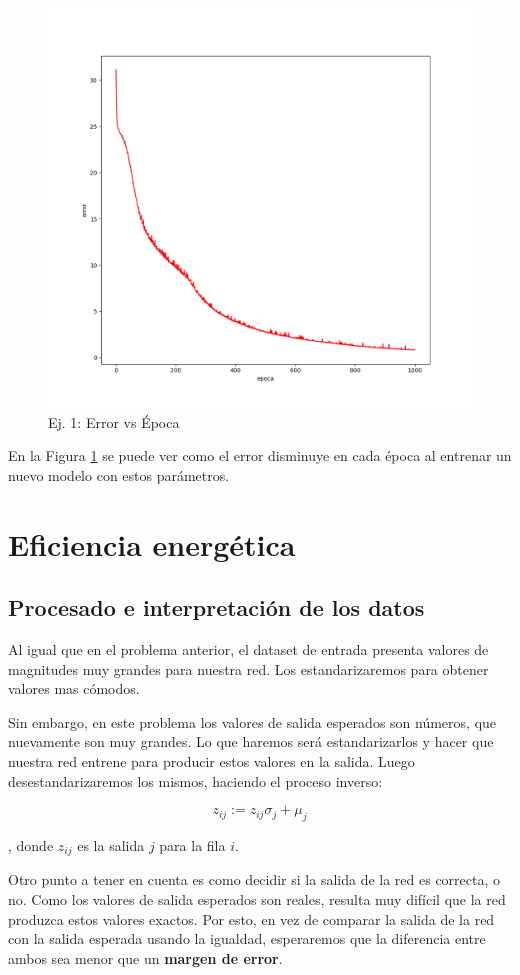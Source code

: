 \documentclass[a4paper,10pt]{article}
\begin{document}
\begin{figure}[H]
	\centering
	\includegraphics[width=.75\textwidth]{ej1-error_vs_epoca.png}
	\caption{Ej. 1: Error vs Época}
	\label{fig:ej1-e_vs_t}
\end{figure}

En la Figura \ref{fig:ej1-e_vs_t} se puede ver como el error disminuye en cada
época al entrenar un nuevo modelo con estos parámetros.

\section{Eficiencia energética}

\subsection{Procesado e interpretación de los datos}

Al igual que en el problema anterior, el dataset de entrada presenta valores
de magnitudes muy grandes para nuestra red. Los estandarizaremos para obtener
valores mas cómodos.

Sin embargo, en este problema los valores de salida esperados son números, que
nuevamente son muy grandes. Lo que haremos será estandarizarlos y hacer que
nuestra red entrene para producir estos valores en la salida. Luego
desestandarizaremos los mismos, haciendo el proceso inverso:

\[ z_{ij} := z_{ij}\sigma_j + \mu_j\]

, donde $z_{ij}$ es la salida $j$ para la fila $i$.

Otro punto a tener en cuenta es como decidir si la salida de la red es
correcta, o no. Como los valores de salida esperados son reales, resulta muy
difícil que la red produzca estos valores exactos. Por esto, en vez de
comparar la salida de la red con la salida esperada usando la igualdad,
esperaremos que la diferencia entre ambos sea menor que un \textbf{margen de
error}.
\end{document}
